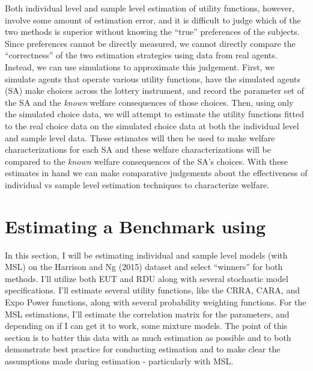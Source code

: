 \documentclass[../main.tex]{subfiles}
\begin{document}
\addtocounter{footnote}{-1}

Both individual level and sample level estimation of utility functions, however, involve some amount of estimation error, and it is difficult to judge which of the two methods is superior without knowing the \enquote{true} preferences of the subjects.
Since preferences cannot be directly measured, we cannot directly compare the \enquote{correctness} of the two estimation strategies using data from real agents.
Instead, we can use simulations to approximate this judgement. 
First, we simulate agents that operate various utility functions, have the simulated agents (SA) make choices across the \textcite{Harrison2015} lottery instrument, and record the parameter set of the SA and the \textit{known} welfare consequences of those choices.
Then, using only the simulated choice data, we will attempt to estimate the utility functions fitted to the real choice data on the simulated choice data at both the individual level and sample level data.
These estimates will then be used to make welfare characterizations for each SA and these welfare characterizations will be compared to the \textit{known} welfare consequences of the SA's choices.
With these estimates in hand we can make comparative judgements about the effectiveness of individual vs sample level estimation techniques to characterize welfare.

\section{Estimating a Benchmark using \texorpdfstring{\textcite{Harrison2015}}{Harrison and Ng (2015)}}

In this section, I will be estimating individual and sample level models (with MSL) on the Harrison and Ng (2015) dataset and select \enquote{winners} for both methods.
I'll utilize both EUT and RDU along with several stochastic model specifications.
I'll estimate several utility functions, like the CRRA, CARA, and Expo Power functions, along with several probability weighting functions.
For the MSL estimations, I'll estimate the correlation matrix for the parameters, and depending on if I can get it to work, some mixture models.
The point of this section is to batter this data with as much estimation as possible and to both demonstrate best practice for conducting estimation and to make clear the assumptions made during estimation - particularly with MSL.
\end{document}
